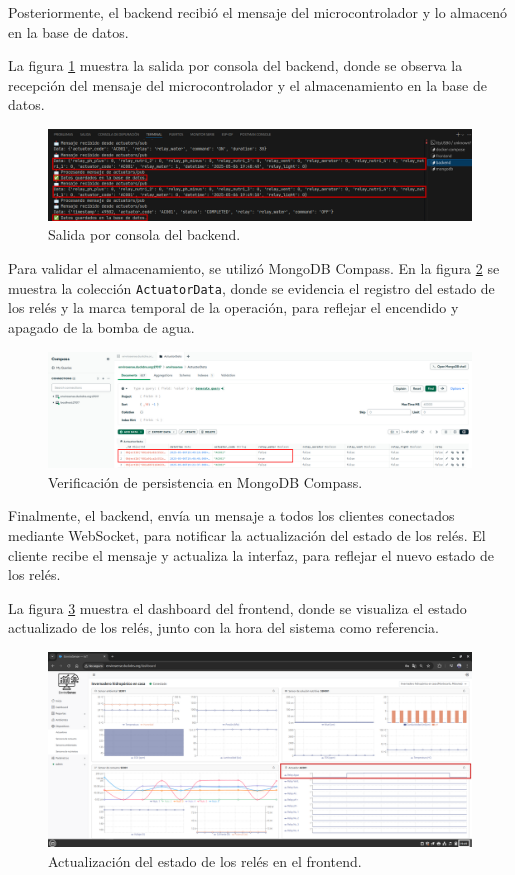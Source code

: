 Posteriormente, el backend recibió el mensaje del microcontrolador y lo
almacenó en la base de datos.

La figura \ref{fig:prueba_integral_5} muestra la salida por consola del
backend, donde se observa la recepción del mensaje del microcontrolador y el
almacenamiento en la base de datos.

\begin{figure}[H]
    \centering
    \includegraphics[width=\textwidth]{Images/59_prueba_integral_5.png}
    \caption[Salida por consola del backend]{Salida por consola del backend.}
    \label{fig:prueba_integral_5}
\end{figure}

Para validar el almacenamiento, se utilizó MongoDB Compass. En la figura
\ref{fig:prueba_integral_6} se muestra la colección \texttt{ActuatorData},
donde se evidencia el registro del estado de los relés y la marca temporal de
la operación, para reflejar el encendido y apagado de la bomba de agua.

\begin{figure}[H]
    \centering
    \includegraphics[width=\textwidth]{Images/59_prueba_integral_6.png}
    \caption[Verificación de persistencia en MongoDB Compass]{Verificación de persistencia en MongoDB Compass.}
    \label{fig:prueba_integral_6}
\end{figure}

Finalmente, el backend, envía un mensaje a todos los clientes conectados
mediante WebSocket, para notificar la actualización del estado de los relés. El
cliente recibe el mensaje y actualiza la interfaz, para reflejar el nuevo
estado de los relés.

La figura \ref{fig:prueba_integral_7} muestra el dashboard del frontend, donde
se visualiza el estado actualizado de los relés, junto con la hora del sistema
como referencia.

\begin{figure}[H]
    \centering
    \includegraphics[width=\textwidth]{Images/59_prueba_integral_7.png}
    \caption[Actualización del estado de los relés en el frontend]{Actualización del estado de los relés en el frontend.}
    \label{fig:prueba_integral_7}
\end{figure}
